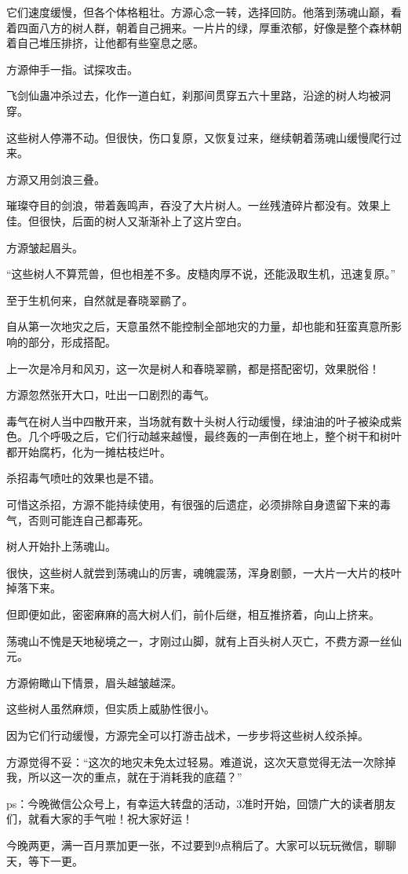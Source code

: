 \begin{this_body}
它们速度缓慢，但各个体格粗壮。方源心念一转，选择回防。他落到荡魂山巅，看着四面八方的树人群，朝着自己拥来。一片片的绿，厚重浓郁，好像是整个森林朝着自己堆压排挤，让他都有些窒息之感。

方源伸手一指。试探攻击。

飞剑仙蛊冲杀过去，化作一道白虹，刹那间贯穿五六十里路，沿途的树人均被洞穿。

这些树人停滞不动。但很快，伤口复原，又恢复过来，继续朝着荡魂山缓慢爬行过来。

方源又用剑浪三叠。

璀璨夺目的剑浪，带着轰鸣声，吞没了大片树人。一丝残渣碎片都没有。效果上佳。但很快，后面的树人又渐渐补上了这片空白。

方源皱起眉头。

“这些树人不算荒兽，但也相差不多。皮糙肉厚不说，还能汲取生机，迅速复原。”

至于生机何来，自然就是春晓翠鹂了。

自从第一次地灾之后，天意虽然不能控制全部地灾的力量，却也能和狂蛮真意所影响的部分，形成搭配。

上一次是冷月和风刃，这一次是树人和春晓翠鹂，都是搭配密切，效果脱俗！

方源忽然张开大口，吐出一口剧烈的毒气。

毒气在树人当中四散开来，当场就有数十头树人行动缓慢，绿油油的叶子被染成紫色。几个呼吸之后，它们行动越来越慢，最终轰的一声倒在地上，整个树干和树叶都开始腐朽，化为一摊枯枝烂叶。

杀招毒气喷吐的效果也是不错。

可惜这杀招，方源不能持续使用，有很强的后遗症，必须排除自身遗留下来的毒气，否则可能连自己都毒死。

树人开始扑上荡魂山。

很快，这些树人就尝到荡魂山的厉害，魂魄震荡，浑身剧颤，一大片一大片的枝叶掉落下来。

但即便如此，密密麻麻的高大树人们，前仆后继，相互推挤着，向山上挤来。

荡魂山不愧是天地秘境之一，才刚过山脚，就有上百头树人灭亡，不费方源一丝仙元。

方源俯瞰山下情景，眉头越皱越深。

这些树人虽然麻烦，但实质上威胁性很小。

因为它们行动缓慢，方源完全可以打游击战术，一步步将这些树人绞杀掉。

方源觉得不妥：“这次的地灾未免太过轻易。难道说，这次天意觉得无法一次除掉我，所以这一次的重点，就在于消耗我的底蕴？”

ps：今晚微信公众号上，有幸运大转盘的活动，3准时开始，回馈广大的读者朋友们，就看大家的手气啦！祝大家好运！

今晚两更，满一百月票加更一张，不过要到9点稍后了。大家可以玩玩微信，聊聊天，等下一更。

\end{this_body}


